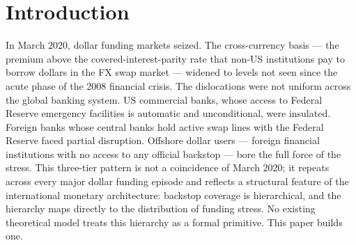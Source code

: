 \section{Introduction}
\label{sec:introduction}

In March 2020, dollar funding markets seized. The cross-currency basis — the premium above the
covered-interest-parity rate that non-US institutions pay to borrow dollars in the FX swap market
— widened to levels not seen since the acute phase of the 2008 financial crisis.
The dislocations were not uniform across the global banking system. US commercial banks, whose
access to Federal Reserve emergency facilities is automatic and unconditional, were insulated.
Foreign banks whose central banks hold active swap lines with the Federal Reserve faced partial
disruption. Offshore dollar users — foreign financial institutions with no access to any official
backstop — bore the full force of the stress. This three-tier pattern is not a coincidence of March
2020; it repeats across every major dollar funding episode and reflects a structural feature of the
international monetary architecture: backstop coverage is hierarchical, and the hierarchy maps
directly to the distribution of funding stress. No existing theoretical model treats this
hierarchy as a formal primitive. This paper builds one.

